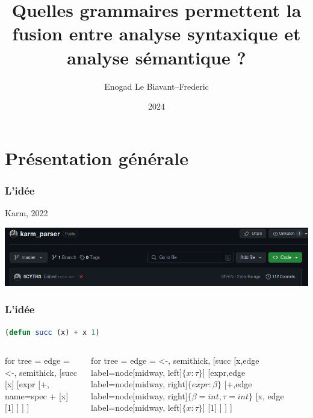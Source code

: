 \documentclass{beamer}
\title{Quelles grammaires permettent la fusion entre analyse syntaxique et analyse sémantique ?}
\author{Enogad Le Biavant--Frederic}
\institute{Alain René Lesage MP2I}
\date{2024}
\begin{document}
\frame{\titlepage}

\section{Présentation générale}
\begin{frame}
		\frametitle{L'idée}
		Karm, 2022
		\begin{center}
				\includegraphics[scale=0.25]{repo}
		\end{center}
		
\end{frame}

\begin{frame}[fragile]
		\frametitle{L'idée}
		\begin{lstlisting}[language=Lisp]
(defun succ (x) + x 1)
		\end{lstlisting}
		\begin{columns}
				\begin{column}{0.5\textwidth}
						\begin{center}
						\begin{forest}
								for tree = {
										edge = {<-, semithick},
								}
								[succ
										[x]
										[expr
												[+, name=spec +
														[x]
														[1]	
												]
										]
								]
						\end{forest}
						\end{center}
				\end{column}
				\begin{column}{0.5\textwidth}
						\begin{center}
						\begin{forest}
								for tree = {
										edge = {<-, semithick},
								}
								[succ
								[x,edge label={node[midway, left]{$\{x:\tau\}$}}]
										[expr,edge label={node[midway, right]{$\{expr:\beta\}$}}
												[+,edge label={node[midway, right]{$\{\beta = int, \tau = int\}$}}
														[x, edge label={node[midway, left]{$\{x:\tau\}$}}]
														[1]	
												]
										]
								]
						\end{forest}
						\end{center}
				\end{column}
		\end{columns}
\end{frame}
\end{document}

